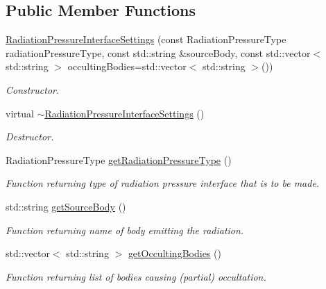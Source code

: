\subsection*{Public Member Functions}
\begin{DoxyCompactItemize}
\item 
\hyperlink{classtudat_1_1simulation__setup_1_1RadiationPressureInterfaceSettings_a0eb8b65046fa6d31c153ec046ae64a34}{Radiation\+Pressure\+Interface\+Settings} (const Radiation\+Pressure\+Type radiation\+Pressure\+Type, const std\+::string \&source\+Body, const std\+::vector$<$ std\+::string $>$ occulting\+Bodies=std\+::vector$<$ std\+::string $>$())
\begin{DoxyCompactList}\small\item\em Constructor. \end{DoxyCompactList}\item 
virtual \hyperlink{classtudat_1_1simulation__setup_1_1RadiationPressureInterfaceSettings_a1ee2146986b286987c1e89de0f0874cf}{$\sim$\+Radiation\+Pressure\+Interface\+Settings} ()\hypertarget{classtudat_1_1simulation__setup_1_1RadiationPressureInterfaceSettings_a1ee2146986b286987c1e89de0f0874cf}{}\label{classtudat_1_1simulation__setup_1_1RadiationPressureInterfaceSettings_a1ee2146986b286987c1e89de0f0874cf}

\begin{DoxyCompactList}\small\item\em Destructor. \end{DoxyCompactList}\item 
Radiation\+Pressure\+Type \hyperlink{classtudat_1_1simulation__setup_1_1RadiationPressureInterfaceSettings_ab827822c9f9c45051cdc4cc1eaa6c992}{get\+Radiation\+Pressure\+Type} ()
\begin{DoxyCompactList}\small\item\em Function returning type of radiation pressure interface that is to be made. \end{DoxyCompactList}\item 
std\+::string \hyperlink{classtudat_1_1simulation__setup_1_1RadiationPressureInterfaceSettings_a09c4c2f0c8bde51a1920f854debb9d04}{get\+Source\+Body} ()
\begin{DoxyCompactList}\small\item\em Function returning name of body emitting the radiation. \end{DoxyCompactList}\item 
std\+::vector$<$ std\+::string $>$ \hyperlink{classtudat_1_1simulation__setup_1_1RadiationPressureInterfaceSettings_ae7f543eb145ddf4bb7ade5c844a6f924}{get\+Occulting\+Bodies} ()
\begin{DoxyCompactList}\small\item\em Function returning list of bodies causing (partial) occultation. \end{DoxyCompactList}\end{DoxyCompactItemize}
